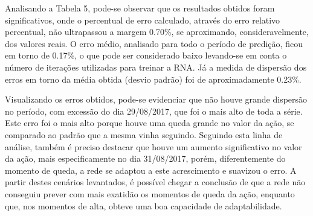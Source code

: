 Analisando a Tabela 5, pode-se observar que os resultados obtidos foram significativos, onde o percentual de erro calculado, através do erro relativo percentual, não ultrapassou a margem 0.70\%, se aproximando, consideravelmente, dos valores reais. O erro médio, analisado para todo o período de predição, ficou em torno de 0.17\%, o que pode ser considerado baixo levando-se em conta o número de iterações utilizadas para treinar a RNA. Já a medida de dispersão dos erros em torno da média obtida (desvio padrão) foi de aproximadamente 0.23\%. 

Visualizando os erros obtidos, pode-se evidenciar que não houve grande dispersão no período, com excessão do dia 29/08/2017, que foi o mais alto de toda a série. Este erro foi o mais alto porque houve uma queda grande no valor da ação, se comparado ao padrão que a mesma vinha seguindo. Seguindo esta linha de análise, também é preciso destacar que houve um aumento significativo no valor da ação, mais especificamente no dia 31/08/2017, porém, diferentemente do momento de queda, a rede se adaptou a este acrescimento e suavizou o erro. A partir destes cenários levantados, é possível chegar a conclusão de que a rede não conseguiu prever com mais exatidão os momentos de queda da ação, enquanto que, nos momentos de alta, obteve uma boa capacidade de adaptabilidade.